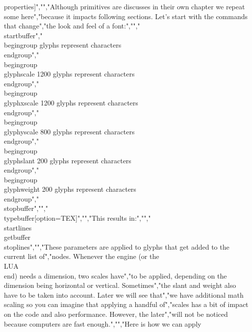 properties]","","Although primitives are discusses in their own chapter we repeat some here","because it impacts following sections. Let's start with the commands that change","the look and feel of a font:","","\\startbuffer","\\begingroup                   glyphs represent characters \\endgroup","\\begingroup \\glyphscale  1200 glyphs represent characters \\endgroup","\\begingroup \\glyphxscale 1200 glyphs represent characters \\endgroup","\\begingroup \\glyphyscale  800 glyphs represent characters \\endgroup","\\begingroup \\glyphslant   200 glyphs represent characters \\endgroup","\\begingroup \\glyphweight  200 glyphs represent characters \\endgroup","\\stopbuffer","","\\typebuffer[option=TEX]","","This results in:","","\\startlines \\getbuffer \\stoplines","","These parameters are applied to glyphs that get added to the current list of","nodes. Whenever the engine (or the \\LUA\\ end) needs a dimension, two scales have","to be applied, depending on the dimension being horizontal or vertical. Sometimes","the slant and weight also have to be taken into account. Later we will see that","we have additional math scaling so you can imagine that applying a handful of","scales has a bit of impact on the code and also performance. However, the later","will not be noticed because computers are fast enough.","","Here is how we can apply 